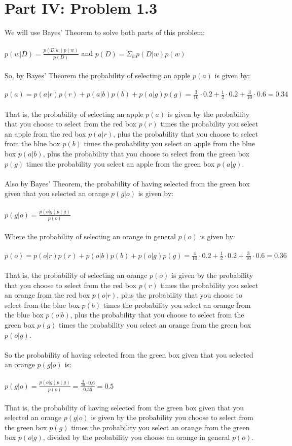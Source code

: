\documentclass[letterpaper,notitlepage,twoside, fleqn]{article}
\begin{document}
\section*{Part IV: Problem 1.3}
We will use Bayes' Theorem to solve both parts of this problem:\\\\
$p(w|D) = \frac{p(D|w)p(w)}{p(D)}$ and $p(D) = \Sigma_w p(D|w)p(w)$ \\\\
So, by Bayes' Theorem the probability of selecting an apple $p(a)$ is given by:\\\\
$p(a) = p(a|r)p(r)+p(a|b)p(b)+p(a|g)p(g) = \frac{3}{10} \cdot 0.2 + \frac{1}{2} \cdot 0.2 + \frac{3}{10} \cdot 0.6 = 0.34$ \\\\
That is, the probability of selecting an apple $p(a)$ is given by the probability that you choose to select from the red box  $p(r)$ times the probability you select an apple from the red box $p(a|r)$, plus the probability that you choose to select from the blue box $p(b)$ times the probability you select an apple from the blue box $p(a|b)$, plus the probability that you choose to select from the green box $p(g)$ times the probability you select an apple from the green box $p(a|g)$. \\\\
Also by Bayes' Theorem, the probability of having selected from the green box given that you selected an orange $p(g|o)$ is given by: \\\\
$p(g|o) = \frac{p(o|g)p(g)}{p(o)}$ \\\\
Where the probability of selecting an orange in general $p(o)$ is given by: \\\\
$p(o) = p(o|r)p(r)+p(o|b)p(b)+p(o|g)p(g) = \frac{4}{10} \cdot 0.2 + \frac{1}{2} \cdot 0.2 + \frac{3}{10} \cdot 0.6 = 0.36$ \\\\
That is, the probability of selecting an orange $p(o)$ is given by the probability that you choose to select from the red box $p(r)$ times the probability you select an orange from the red box $p(o|r)$, plus the probability that you choose to select from the blue box $p(b)$ times the probability you select an orange from the blue box $p(o|b)$, plus the probability that you choose to select from the green box $p(g)$ times the probability you select an orange from the green box $p(o|g)$. \\\\
So the probability of having selected from the green box given that you selected an orange $p(g|o)$ is: \\\\
$p(g|o) = \frac{p(o|g)p(g)}{p(o)} = \frac{\frac{3}{10} \cdot 0.6}{0.36} = 0.5$ \\\\
That is, the probability of having selected from the green box given that you selected an orange $p(g|o)$ is given by the probability you choose to select from the green box $p(g)$ times the probability you select an orange from the green box $p(o|g)$, divided by the probability you choose an orange in general $p(o)$.
\end{document}
